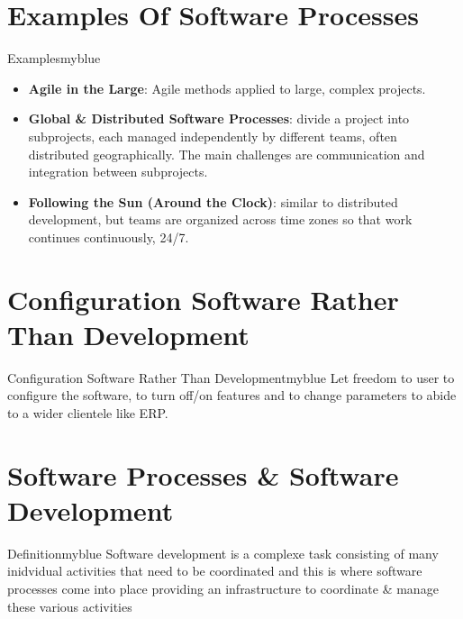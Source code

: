\documentclass{report}
\begin{document}
\vspace{0.15cm}

\section{Examples Of Software Processes}
\begin{prettyBox}{Examples}{myblue}
    \begin{itemize}
        \itemsep0em 
        \item \textbf{Agile in the Large}: Agile methods applied to large, complex projects.
        \item \textbf{Global \& Distributed Software Processes}: divide a project into subprojects, each managed independently by different teams, often distributed geographically. The main challenges are communication and integration between subprojects.
        \item \textbf{Following the Sun (Around the Clock)}: similar to distributed development, but teams are organized across time zones so that work continues continuously, 24/7.
    \end{itemize}
\end{prettyBox}

\vspace{0.25cm}

\section{Configuration Software Rather Than Development}
\begin{prettyBox}{Configuration Software Rather Than Development}{myblue}
    Let freedom to user to configure the software, to turn off/on features and to change parameters to abide to a wider clientele like ERP.
\end{prettyBox}

\vspace{0.25cm}

\section{Software Processes \& Software Development}
\begin{prettyBox}{Definition}{myblue}
    Software development is a complexe task consisting of many inidvidual activities that need to be coordinated and this is where software
    processes come into place providing an infrastructure to coordinate \& manage these various activities
\end{prettyBox}
\end{document}
